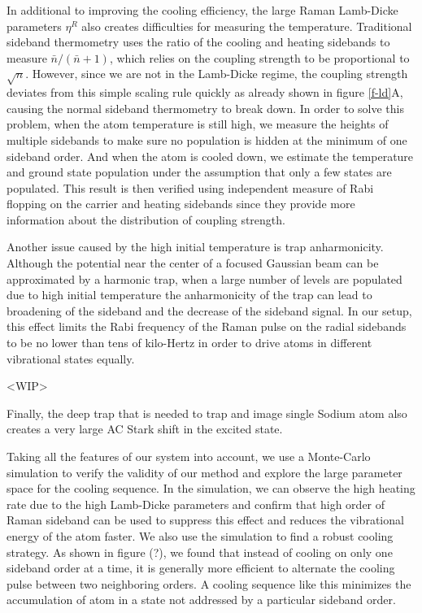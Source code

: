 \documentclass[aps,prl,twocolumn,groupedaddress]{revtex4-1}
\begin{document}
In additional to improving the cooling efficiency, the large Raman Lamb-Dicke parameters $\eta^R$
also creates difficulties for measuring the temperature. Traditional sideband thermometry uses
the ratio of the cooling and heating sidebands to measure $\bar n / (\bar n + 1)$, which relies
on the coupling strength to be proportional to $\sqrt{n}$. However, since we are not in the
Lamb-Dicke regime, the coupling strength deviates from this simple scaling rule quickly as already
shown in figure \ref{f-ld}A, causing the normal sideband thermometry to break down.
In order to solve this problem, when the atom temperature is still high,
we measure the heights of multiple sidebands to make sure no population is hidden at the
minimum of one sideband order. And when the atom is cooled down, we estimate the temperature
and ground state population under the assumption that only a few states are populated.
This result is then verified using independent measure of Rabi flopping on the carrier and heating
sidebands since they provide more information about the distribution of coupling strength.

Another issue caused by the high initial temperature is trap anharmonicity.
Although the potential near the center of a focused Gaussian beam can be approximated
by a harmonic trap, when a large number of levels are populated due to high initial temperature
the anharmonicity of the trap can lead to broadening of the sideband and the decrease of
the sideband signal. In our setup, this effect limits the Rabi frequency of the Raman pulse
on the radial sidebands to be no lower than tens of kilo-Hertz in order to drive atoms in
different vibrational states equally.

<WIP>

Finally, the deep trap that is needed to trap and image single Sodium atom also creates
a very large AC Stark shift in the excited state.


Taking all the features of our system into account, we use a Monte-Carlo simulation to verify
the validity of our method and explore the large parameter space for the cooling sequence.
In the simulation, we can observe the high heating rate due to the high Lamb-Dicke parameters
and confirm that high order of Raman sideband can be used to suppress this effect and reduces
the vibrational energy of the atom faster.
We also use the simulation to find a robust cooling strategy. As shown in figure (?),
we found that instead of cooling on only one sideband order at a time, it is generally more
efficient to alternate the cooling pulse between two neighboring orders. A cooling sequence
like this minimizes the accumulation of atom in a state not addressed by a particular sideband order.\\
\end{document}
